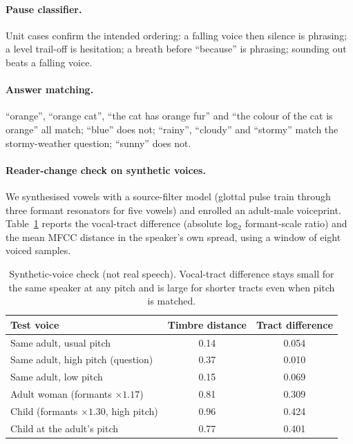 \documentclass[manuscript, screen, review, anonymous]{acmart}
\begin{document}
\paragraph{Pause classifier.} Unit cases confirm the intended ordering: a falling voice then silence is phrasing; a level trail-off is hesitation; a breath before ``because'' is phrasing; sounding out beats a falling voice.

\paragraph{Answer matching.} ``orange'', ``orange cat'', ``the cat has orange fur'' and ``the colour of the cat is orange'' all match; ``blue'' does not; ``rainy'', ``cloudy'' and ``stormy'' match the stormy-weather question; ``sunny'' does not.

\paragraph{Reader-change check on synthetic voices.} We synthesised vowels with a source-filter model (glottal pulse train through three formant resonators for five vowels) and enrolled an adult-male voiceprint. Table~\ref{tab:voice} reports the vocal-tract difference (absolute log$_2$ formant-scale ratio) and the mean MFCC distance in the speaker's own spread, using a window of eight voiced samples.

\begin{table}[h]
\caption{Synthetic-voice check (not real speech). Vocal-tract difference stays small for the same speaker at any pitch and is large for shorter tracts even when pitch is matched.}
\label{tab:voice}
\begin{tabular}{@{}lcc@{}}
\toprule
Test voice & Timbre distance & Tract difference \\
\midrule
Same adult, usual pitch & 0.14 & 0.054 \\
Same adult, high pitch (question) & 0.37 & 0.010 \\
Same adult, low pitch & 0.15 & 0.069 \\
Adult woman (formants $\times1.17$) & 0.81 & 0.309 \\
Child (formants $\times1.30$, high pitch) & 0.96 & 0.424 \\
Child at the adult's pitch & 0.77 & 0.401 \\
\bottomrule
\end{tabular}
\end{table}
\end{document}
